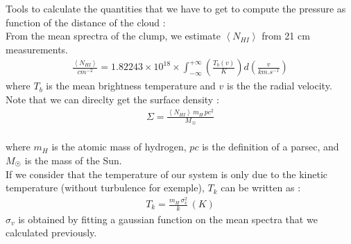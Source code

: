 \documentclass[a4paper,10.5pt]{report}
\begin{document}
Tools to calculate the quantities that we have to get to compute the pressure as function of the distance of the cloud : \\

\noindent From the mean sprectra of the clump, we estimate $\left< N_{HI} \right>$ from 21 cm measurements. \\
\begin{align}
  \frac{\left< N_{HI} \right>}{cm^{-2}} = 1.82243 \times 10^{18} \times \int_{-\infty}^{+\infty} \left( \frac{T_b(v)}{K} \right) 
  d\left( \frac{v}{km.s^{-1}}\right)
  \label{eq::NHI}
\end{align} 
where $T_b$ is the mean brightness temperature and $v$ is the the radial velocity. \\

\noindent Note that we can direclty get the surface density :
\begin{align}
  \Sigma = \frac{\left<N_{HI}\right> \, m_H \, pc^2}{M_\astrosun}
\end{align} \\
where $m_H$ is the atomic mass of hydrogen, $pc$ is the definition of a parsec,
and $M_{\astrosun}$ is the mass of the Sun. \\

If we consider that the temperature of our system is only due to the kinetic temperature (without turbulence for exemple), 
$T_k$ can be written as : 
\begin{align}
  T_k = \frac{m_H \, \sigma_v^2}{k} \, (K)
\end{align}
$\sigma_v$ is obtained by fitting a gaussian function on the mean spectra that we calculated previously.

\newpage
\end{document}
